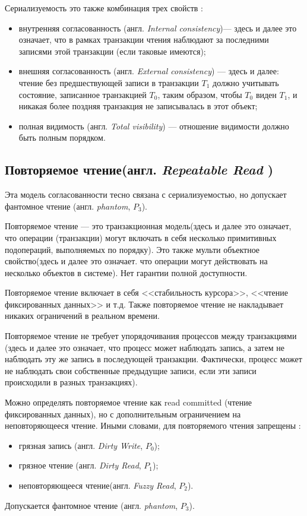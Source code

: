 \documentclass[12pt,  openany]{book}
\begin{document}
\par
Сериализуемость это также комбинация трех свойств \cite{cerone_et_al}:
\begin{itemize}
\item внутренняя согласованность (англ. \textit{Internal consistency})--- здесь и далее это означает, что в рамках транзакции чтения наблюдают за последними записями этой транзакции (если таковые имеются);
\item внешняя согласованность (англ. \textit{External consistency}) --- здесь и далее: чтение без предшествующей записи в транзакции $T_1$ должно учитывать состояние, записанное транзакцией $T_0$, таким образом, чтобы $T_0$ виден $T_1$, и никакая более поздняя транзакция не записывалась в этот объект;
\item полная видимость (англ. \textit{Total visibility}) --- отношение видимости должно быть полным порядком.
\end{itemize}

\subsection{Повторяемое чтение(англ.  \textit{Repeatable Read })}
Эта модель согласованности тесно связана с сериализуемостью, но допускает фантомное чтение (англ. \textit{phantom}, $P_3$).
\par
Повторяемое чтение --- это транзакционная модель(здесь и далее это означает, что операции (транзакции) могут включать в себя несколько примитивных подопераций, выполняемых по порядку).  Это также мульти объектное свойство(здесь и далее это означает. что операции могут действовать на несколько объектов в системе). Нет гарантии полной доступности.
\par
Повторяемое чтение включает в себя <<стабильность курсора>>, <<чтение фиксированных данных>> и т.д.
Также повторяемое чтение не накладывает никаких ограничений в реальном времени.
\par
Повторяемое чтение не требует упорядочивания процессов между транзакциями (здесь и далее это означает, что процесс может наблюдать запись, а затем не наблюдать эту же запись в последующей транзакции. Фактически, процесс может не наблюдать свои собственные предыдущие записи, если эти записи происходили в разных транзакциях).
\par
Можно определять повторяемое чтение как  read committed (чтение фиксированных данных), но с дополнительным ограничением на неповторяющееся чтение.
Иными словами, для повторяемого чтения запрещены \cite{adya99:_weak_consis}:
\begin{itemize}
  \item грязная запись (англ.  \textit{Dirty Write},  $P_0$);
  \item грязное чтение (англ. \textit{Dirty Read}, $P_1$);
  \item неповторяющееся чтение(англ. \textit{Fuzzy Read}, $P_2$).
\end{itemize}
Допускается фантомное чтение (англ. \textit{phantom}, $P_3$).
\end{document}
